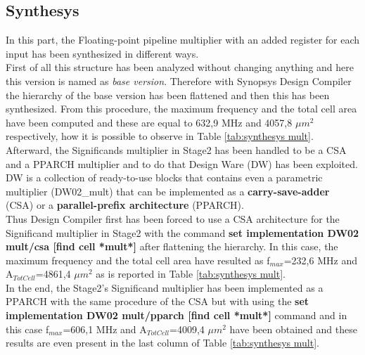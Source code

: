 \documentclass[a4paper, titlepage]{article}
\begin{document}
\subsection{Synthesys}
In this part, the Floating-point pipeline multiplier with an added register for each input has been synthesized in different ways.\\First of all this structure has been analyzed without changing anything and here this version is named as \textit{base version}. Therefore with Synopsys Design Compiler the hierarchy of the base version has been flattened and then this has been synthesized. From this procedure, the maximum frequency and the total cell area have been computed and these are equal to 632,9 MHz and 4057,8 $\mu m^2$ respectively, how it is possible to observe in Table \ref{tab:synthesys mult}.\\Afterward, the Significands multiplier in Stage2 has been handled to be a CSA and a PPARCH multiplier and to do that Design Ware (DW) has been exploited. %
DW is a collection of ready-to-use blocks that contains even a parametric multiplier (DW02\_mult) that can be implemented as a \textbf{carry-save-adder} (CSA) or a \textbf{parallel-prefix architecture} (PPARCH).\\Thus Design Compiler first has been forced to use a CSA architecture for the Significand multiplier in Stage2 with the command \textbf{set implementation DW02 mult/csa [find cell *mult*]} after flattening the hierarchy. In this case, the maximum frequency and the total cell area have resulted as f$_{max}$=232,6 MHz and A$_{Tot Cell}$=4861,4 $\mu m^2$ as is reported in Table \ref{tab:synthesys mult}.\\In the end, the Stage2's Significand multiplier has been implemented as a PPARCH with the same procedure of the CSA but with using the \textbf{set implementation DW02 mult/pparch [find cell *mult*]} command and in this case f$_{max}$=606,1 MHz and A$_{Tot Cell}$=4009,4 $\mu m^2$ have been obtained and these results are even present in the last column of Table \ref{tab:synthesys mult}.
\end{document}
